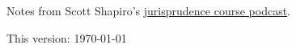 \documentclass{article}
\begin{document}

Notes from Scott Shapiro's \href{https://anchor.fm/scott-shapiro}{jurisprudence course podcast}.

\begin{small}
This version: \today
\end{small}

\tableofcontents


\end{document}
